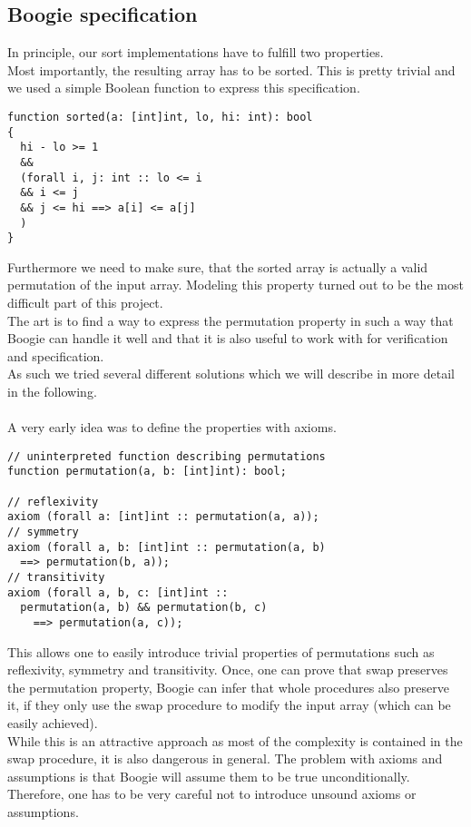 \documentclass{report}
\begin{document}
\subsection{Boogie specification}
\label{s:boogie_specification}
In principle, our sort implementations have to fulfill two properties.\\
Most importantly, the resulting array has to be sorted. This is pretty trivial and we used
a simple Boolean function to express this specification.
\begin{lstlisting}
function sorted(a: [int]int, lo, hi: int): bool
{
  hi - lo >= 1
  &&
  (forall i, j: int :: lo <= i 
  && i <= j 
  && j <= hi ==> a[i] <= a[j]
  )
}
\end{lstlisting}
Furthermore we need to make sure, that the sorted array is actually a valid
permutation of the input array. Modeling this property turned out to be the most difficult part
of this project.\\
The art is to find a way to express the permutation property in such a way that
Boogie can handle it well and that it is also useful to work with for verification
and specification.\\
As such we tried several different solutions which we will describe in more detail
in the following.
\\
\\
A very early idea was to define the properties with axioms.
\begin{lstlisting}
// uninterpreted function describing permutations
function permutation(a, b: [int]int): bool;

// reflexivity
axiom (forall a: [int]int :: permutation(a, a));
// symmetry
axiom (forall a, b: [int]int :: permutation(a, b)
  ==> permutation(b, a));
// transitivity
axiom (forall a, b, c: [int]int ::
  permutation(a, b) && permutation(b, c)
    ==> permutation(a, c));
\end{lstlisting}
This allows one to easily introduce trivial properties of permutations such as
reflexivity, symmetry and transitivity. Once, one can prove that swap preserves
the permutation property, Boogie can infer that whole procedures also preserve
it, if they only use the swap procedure to modify the input array (which can be easily achieved).\\
While this is an attractive approach as most of the complexity is contained in the swap procedure,
it is also dangerous in general. The problem with axioms and assumptions is that Boogie will assume them to be true unconditionally. Therefore,
one has to be very careful not to introduce unsound axioms or assumptions.\\
\end{document}
